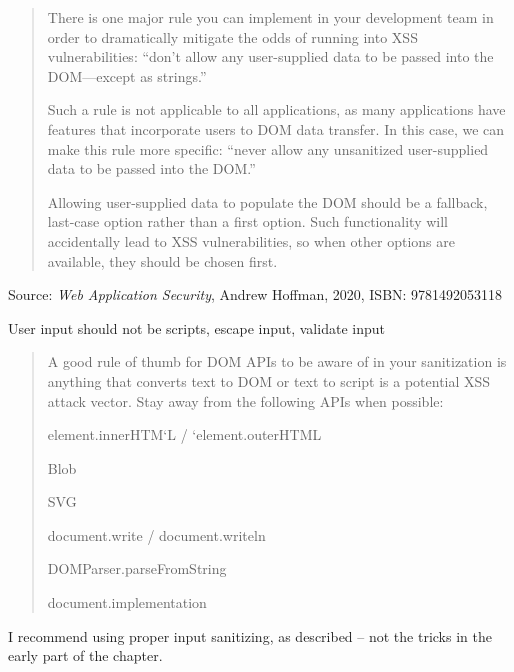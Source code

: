 \documentclass[Screen16to9,17pt]{foils}
\begin{document}
\begin{quote}
There is one major rule you can implement in your development team in order to dramatically mitigate the odds of running into XSS vulnerabilities: “don’t allow any user-supplied data to be passed into the DOM—except as strings.”

Such a rule is not applicable to all applications, as many applications have features that incorporate users to DOM data transfer. In this case, we can make this rule more specific: “never allow any unsanitized user-supplied data to be passed into the DOM.”

Allowing user-supplied data to populate the DOM should be a fallback, last-case option rather than a first option. Such functionality will accidentally lead to XSS vulnerabilities, so when other options are available, they should be chosen first.
\end{quote}
Source: \emph{Web Application Security}, Andrew Hoffman, 2020, ISBN: 9781492053118

\begin{list2}
\item User input should not be scripts, escape input, validate input
\end{list2}




\begin{quote}
A good rule of thumb for DOM APIs to be aware of in your sanitization is anything
that converts text to DOM or text to script is a potential XSS attack vector.
Stay away from the following APIs when possible:
\begin{list2}
\item element.innerHTM`L / `element.outerHTML
\item Blob
\item SVG
\item document.write / document.writeln
\item DOMParser.parseFromString
\item document.implementation
\end{list2}
\end{quote}

\begin{list2}
\item I recommend using proper input sanitizing, as described -- not the tricks in the early part of the chapter.
\end{list2}
\end{document}
